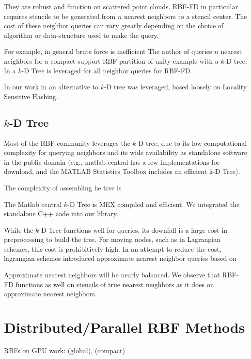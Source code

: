 \documentclass[11pt]{report}
\begin{document}
{They are robust and function on scattered point clouds. RBF-FD in particular requires stencils to be generated from $n$ nearest neighbors to a stencil center. The cost of these neighbor queries can vary greatly depending on the choice of algorithm or data-structure used to make the query. 

For example, in general brute force is inefficient 
The author of \cite{Fasshauer2007} queries $n$ nearest neighbors for a compact-support RBF partition of unity example with a $k$-D tree. In \cite{FlyerLehto11,FornbergLehto11} a $k$-D Tree is leveraged for all neighbor queries for RBF-FD. 

In our work in \cite{BolligFlyerErlebacher2012} an alternative to $k$-D tree was leveraged, based loosely on Locality Sensitive Hashing.

\subsection{$k$-D Tree}

Most of the RBF community leverages the $k$-D tree, due to its low computational complexity for querying neighbors and its wide availability as standalone software in the public domain (e.g., matlab central has a few implementations for download, and the MATLAB Statistics Toolbox includes an efficient k-D Tree). 

The complexity of assembling he tree is

The Matlab central $k$-D Tree is MEX compiled and efficient. We integrated the standalone C++ code into our library.  

While the $k$-D Tree functions well for queries, its downfall is a large cost in preprocessing to build the tree. For moving nodes, such as in Lagrangian schemes, this cost is prohibitively high. In an attempt to reduce the cost, lagrangian schemes introduced approximate nearest neighbor queries based on 

Approximate nearest neighbors will be nearly balanced. 
We observe that RBF-FD functions as well on stencils of true nearest neighbors as it does on approximate nearest neighbors. 



\section{Distributed/Parallel RBF Methods}
\label{chap:parallel_rbf} 

RBFs on GPU work: \cite{Schmidt2009a, Schmidt2009b} (global), \cite{Yokota2010} (compact)




}
\end{document}
